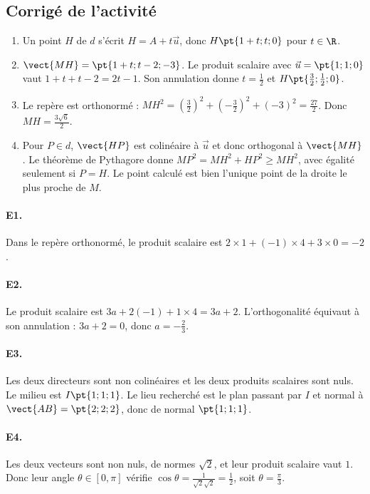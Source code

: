 \subsection{Corrigé de l'activité}\begin{enumerate}
\item Un point $H$ de $d$ s'écrit $H=A+t\vec u$, donc $H\pt{1+t;t;0}$ pour $t\in\R$.
\item $\vect{MH}=\pt{1+t;t-2;-3}$. Le produit scalaire avec $\vec u=\pt{1;1;0}$ vaut $1+t+t-2=2t-1$. Son annulation donne $t=\frac{1}{2}$ et $H\pt{\frac{3}{2};\frac{1}{2};0}$.
\item Le repère est orthonormé : $MH^2=(\frac{3}{2})^2+(-\frac{3}{2})^2+(-3)^2=\frac{27}{2}$. Donc $MH=\frac{3\sqrt{6}}{2}$.
\item Pour $P\in d$, $\vect{HP}$ est colinéaire à $\vec u$ et donc orthogonal à $\vect{MH}$. Le théorème de Pythagore donne $MP^2=MH^2+HP^2\ge MH^2$, avec égalité seulement si $P=H$. Le point calculé est bien l'unique point de la droite le plus proche de $M$.
\end{enumerate}

\paragraph{E1.}Dans le repère orthonormé, le produit scalaire est $2\times1+(-1)\times4+3\times0=-2$.

\paragraph{E2.}Le produit scalaire est $3a+2(-1)+1\times4=3a+2$. L'orthogonalité équivaut à son annulation : $3a+2=0$, donc $a=-\frac{2}{3}$.

\paragraph{E3.}Les deux directeurs sont non colinéaires et les deux produits scalaires sont nuls. Le milieu est $I\pt{1;1;1}$. Le lieu recherché est le plan passant par $I$ et normal à $\vect{AB}=\pt{2;2;2}$, donc de normal $\pt{1;1;1}$.

\paragraph{E4.}Les deux vecteurs sont non nuls, de normes $\sqrt2$, et leur produit scalaire vaut $1$. Donc leur angle $\theta\in[0,\pi]$ vérifie $\cos \theta=\frac{1}{\sqrt2\sqrt2}=\frac{1}{2}$, soit $\theta=\frac{\pi}{3}$.

